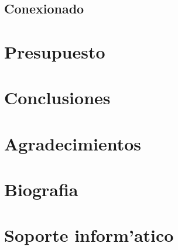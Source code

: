 \documentclass[twoside,12pt]{article}
\begin{document}
\subsection{Conexionado}

\newpage


\section{Presupuesto}
\newpage

\section{Conclusiones}
\newpage

\section{Agradecimientos}
\newpage

\section{Biografia}
\newpage

\section{Soporte inform'atico}
\end{document}

